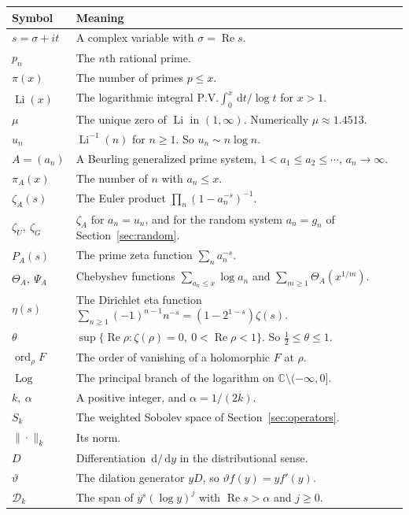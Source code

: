 \documentclass[12pt,letterpaper]{article}
\theoremstyle{definition}
\theoremstyle{remark}
\numberwithin{equation}{section}
\newcommand{\Li}{\operatorname{Li}}
\newcommand{\Log}{\operatorname{Log}}
\newcommand{\Ree}{\operatorname{Re}}
\newcommand{\dd}{\,\mathrm{d}}
\newcommand{\CC}{\mathbb{C}}
\newcommand{\Dk}{\mathcal{D}_k}
\newcommand{\ord}{\operatorname{ord}}
\newcommand{\yD}{\vartheta}
\begin{document}
\begin{longtable}{@{}p{}p{}@{}}
\toprule
\textbf{Symbol} & \textbf{Meaning}\\
\midrule
\endhead
$s=\sigma+it$ & A complex variable with $\sigma=\Ree s$.\\
$p_n$ & The $n$th rational prime.\\
$\pi(x)$ & The number of primes $p\le x$.\\
$\Li(x)$ & The logarithmic integral $\mathrm{P.V.}\int_0^x \dd t/\log t$ for
$x>1$.\\
$\mu$ & The unique zero of $\Li$ in $(1,\infty)$. Numerically
$\mu\approx 1.4513$.\\
$u_n$ & $\Li^{-1}(n)$ for $n\ge1$. So $u_n\sim n\log n$.\\
$A=(a_n)$ & A Beurling generalized prime system, $1<a_1\le a_2\le\cdots$,
$a_n\to\infty$.\\
$\pi_A(x)$ & The number of $n$ with $a_n\le x$.\\
$\zeta_A(s)$ & The Euler product $\prod_n(1-a_n^{-s})^{-1}$.\\
$\zeta_U,\ \zeta_G$ & $\zeta_A$ for $a_n=u_n$, and for the random system
$a_n=g_n$ of Section~\ref{sec:random}.\\
$P_A(s)$ & The prime zeta function $\sum_n a_n^{-s}$.\\
$\Theta_A,\ \Psi_A$ & Chebyshev functions $\sum_{a_n\le x}\log a_n$ and
$\sum_{m\ge1}\Theta_A(x^{1/m})$.\\
$\eta(s)$ & The Dirichlet eta function
$\sum_{n\ge1}(-1)^{n-1}n^{-s}=(1-2^{1-s})\zeta(s)$.\\
$\theta$ & $\sup\{\Ree\rho:\zeta(\rho)=0,\ 0<\Ree\rho<1\}$. So
$\tfrac12\le\theta\le1$.\\
$\ord_\rho F$ & The order of vanishing of a holomorphic $F$ at $\rho$.\\
$\Log$ & The principal branch of the logarithm on
$\CC\setminus(-\infty,0]$.\\
$k,\ \alpha$ & A positive integer, and $\alpha=1/(2k)$.\\
$S_k$ & The weighted Sobolev space of Section~\ref{sec:operators}.\\
$\|\cdot\|_k$ & Its norm.\\
$D$ & Differentiation $\dd/\dd y$ in the distributional sense.\\
$\yD$ & The dilation generator $yD$, so $\yD f(y)=yf'(y)$.\\
$\Dk$ & The span of $y^s(\log y)^j$ with $\Ree s>\alpha$ and $j\ge0$.\\

\end{longtable}
\end{document}
